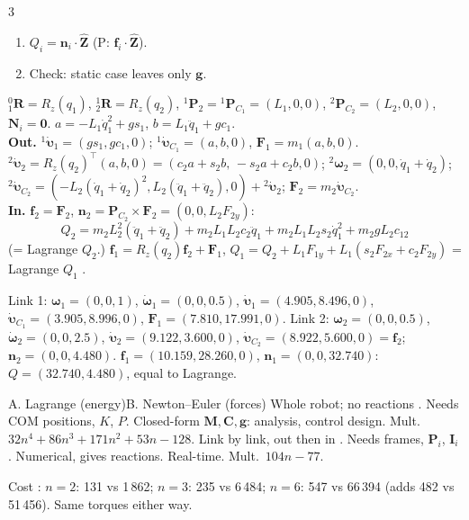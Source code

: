\begin{multicols}{3}
\begin{recipe}
\begin{enumerate}
\item $Q_i=\mathbf n_i\cdot\hat{\mathbf Z}$ (P: $\mathbf f_i\cdot\hat{\mathbf Z}$).
\item Check: static case leaves only $\mathbf g$.
\end{enumerate}
\end{recipe}
\begin{deriv}
${}^0_1\mathbf R=R_z(q_1)$, ${}^1_2\mathbf R=R_z(q_2)$, ${}^1\mathbf P_2={}^1\mathbf P_{C_1}=(L_1,0,0)$, ${}^2\mathbf P_{C_2}=(L_2,0,0)$, $\mathbf N_i=\mathbf 0$. $a=-L_1\dot q_1^2+gs_1$, $b=L_1\ddot q_1+gc_1$.\\
\textbf{Out.} ${}^1\dot{\boldsymbol\upsilon}_1=(gs_1,gc_1,0)$; ${}^1\dot{\boldsymbol\upsilon}_{C_1}=(a,b,0)$, $\mathbf F_1=m_1(a,b,0)$. ${}^2\dot{\boldsymbol\upsilon}_2=R_z(q_2)^\top(a,b,0)=(c_2a{+}s_2b,\,-s_2a{+}c_2b,0)$; ${}^2\boldsymbol\omega_2=(0,0,\dot q_1{+}\dot q_2)$; ${}^2\dot{\boldsymbol\upsilon}_{C_2}=(-L_2(\dot q_1{+}\dot q_2)^2,L_2(\ddot q_1{+}\ddot q_2),0)+{}^2\dot{\boldsymbol\upsilon}_2$; $\mathbf F_2=m_2\dot{\boldsymbol\upsilon}_{C_2}$.\\
\textbf{In.} $\mathbf f_2=\mathbf F_2$, $\mathbf n_2=\mathbf P_{C_2}\times\mathbf F_2=(0,0,L_2F_{2y})$:
\[Q_2=m_2L_2^2(\ddot q_1{+}\ddot q_2)+m_2L_1L_2c_2\ddot q_1+m_2L_1L_2s_2\dot q_1^2+m_2gL_2c_{12}\]
(= Lagrange $Q_2$.)
$\mathbf f_1=R_z(q_2)\mathbf f_2+\mathbf F_1$, $Q_1=Q_2+L_1F_{1y}+L_1(s_2F_{2x}+c_2F_{2y})$ = Lagrange $Q_1$ \chk.
\end{deriv}
\begin{worked}
Link 1: $\boldsymbol\omega_1=(0,0,1)$, $\dot{\boldsymbol\omega}_1=(0,0,0.5)$, $\dot{\boldsymbol\upsilon}_1=(4.905,8.496,0)$, $\dot{\boldsymbol\upsilon}_{C_1}=(3.905,8.996,0)$, $\mathbf F_1=(7.810,17.991,0)$.
Link 2: $\boldsymbol\omega_2=(0,0,0.5)$, $\dot{\boldsymbol\omega}_2=(0,0,2.5)$, $\dot{\boldsymbol\upsilon}_2=(9.122,3.600,0)$, $\dot{\boldsymbol\upsilon}_{C_2}=(8.922,5.600,0)=\mathbf f_2$; $\mathbf n_2=(0,0,4.480)$.
$\mathbf f_1=(10.159,28.260,0)$, $\mathbf n_1=(0,0,32.740)$: $Q=(32.740,4.480)$, equal to Lagrange. \chk
\end{worked}

\label{w7:twoway}
\begin{twoway}{A. Lagrange (energy)}{B. Newton--Euler (forces)}
Whole robot; no reactions . Needs COM positions, $K$, $P$. Closed-form $\mathbf M,\mathbf C,\mathbf g$: analysis, control design. Mult.\ $32n^4{+}86n^3{+}171n^2{+}53n{-}128$.
\tcblower
Link by link, out then in . Needs frames, $\mathbf P_i$, $\mathbf I_i$. Numerical, gives reactions. Real-time. Mult.\ $104n-77$.
\end{twoway}
Cost : $n=2$: 131 vs 1\,862; $n=3$: 235 vs 6\,484; $n=6$: 547 vs 66\,394 (adds 482 vs 51\,456). Same torques either way.


\end{multicols}
